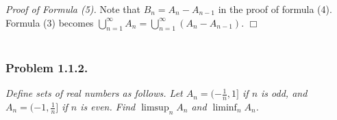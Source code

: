 \documentclass{article}
\begin{document}
\emph{Proof of Formula (5).}
  Note that $B_n = A_{n} - A_{n-1}$ in the proof of formula (4).
  Formula (3) becomes
  $\bigcup_{n=1}^{\infty} A_n = \bigcup_{n=1}^{\infty} (A_n - A_{n-1})$.
$\Box$ \\\\






\subsubsection*{Problem 1.1.2.}
\emph{Define sets of real numbers as follows.
Let $A_n = (-\frac{1}{n}, 1]$ if $n$ is odd, and
$A_n = (-1, \frac{1}{n}]$ if $n$ is even.
Find $\limsup_n A_n$ and $\liminf_n A_n$.} \\
\end{document}
